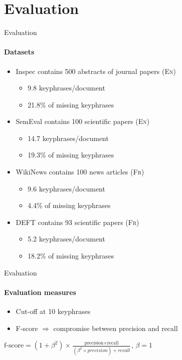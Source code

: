 \section{Evaluation}
  \begin{frame}{Evaluation}
    \framesubtitle{Datasets}

    \begin{itemize}
      \item{Inspec contains 500 abstracts of journal papers ({\small\textsc{En}})}
      \begin{itemize}
        [triangle]
        \item{9.8 keyphrases/document}
        \item{21.8\% of missing keyphrases}
      \end{itemize}
    \item{SemEval contains 100 scientific papers ({\small\textsc{En}})}
      \begin{itemize}
        [triangle]
        \item{14.7 keyphrases/document}
        \item{19.3\% of missing keyphrases}
      \end{itemize}
      \item{WikiNews contains 100 news articles ({\small\textsc{Fr}})}
      \begin{itemize}
        [triangle]
        \item{9.6 keyphrases/document}
        \item{4.4\% of missing keyphrases}
      \end{itemize}
      \item{DEFT contains 93 scientific papers ({\small\textsc{Fr}})}
      \begin{itemize}
        [triangle]
        \item{5.2 keyphrases/document}
        \item{18.2\% of missing keyphrases}
      \end{itemize}
    \end{itemize}
  \end{frame}

  \begin{frame}{Evaluation}
    \framesubtitle{Evaluation measures}

    \begin{itemize}
      \item{Cut-off at 10 keyphrases}
      \item{F-score $\Rightarrow$ compromise between precision and recall}
    \end{itemize}

    \begin{center}
      $\text{f-score} = (1 + \beta^2) \times \frac{\text{precision} \times \text{recall}}{(\beta^2 \times precision) + recall}$,
      $\beta = 1$
    \end{center}
  \end{frame}

